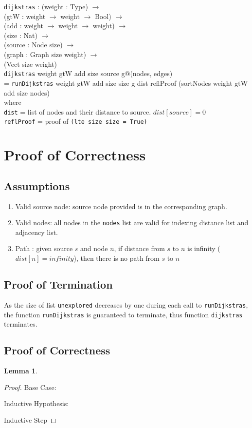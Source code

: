 \documentclass[11pt, oneside]{article}   	%
\newcommand\tab[1][1cm]{\hspace*{#1}}
\newtheorem*{lemma}{Lemma}
\begin{document}
\texttt{dijkstras} :  (weight : Type) $\rightarrow$ \\
                \tab\tab (gtW : weight $\rightarrow$ weight $\rightarrow$ Bool) $\rightarrow$ \\
            	\tab\tab(add : weight $\rightarrow$ weight $\rightarrow$ weight) $\rightarrow$ \\
            	\tab\tab(size : Nat) $\rightarrow$ \\
            	\tab\tab(source : Node size) $\rightarrow$ \\
            	\tab\tab(graph : Graph size weight) $\rightarrow$ \\
            	\tab\tab(Vect size weight)\\
\texttt{dijkstras} weight gtW add size source g@(nodes, edges) \\
\tab  = \texttt{runDijkstras} weight gtW add size size g dist reflProof (sortNodes weight gtW add size nodes) \\
\tab\tab where \\
\tab\tab\tab \texttt{dist} = list of nodes and their distance to source. $dist[source] = 0$\\
\tab\tab\tab \texttt{reflProof} = proof of \texttt{(lte size size = True)}

\section{Proof of Correctness} 

\subsection{Assumptions}
\begin{enumerate}
  \item Valid source node: source node provided is in the corresponding graph. 
  \item Valid nodes: all nodes in the \texttt{nodes} list are valid for indexing distance list and adjacency list. 
  \item Path : given source $s$ and node $n$, if distance from $s$ to $n$ is infinity ($dist[n] = infinity$), then there is no path from $s$ to $n$
\end{enumerate}

\subsection{Proof of Termination}
As the size of list \texttt{unexplored} decreases by one during each call to \texttt{runDijkstras}, the function \texttt{runDijkstras} is guaranteed to terminate, thus function \texttt{dijkstras} terminates. 

\subsection{Proof of Correctness}


\begin{lemma}

\end{lemma}

\begin{proof}
Base Case:

Inductive Hypothesis:

Inductive Step
\end{proof}
\end{document}
